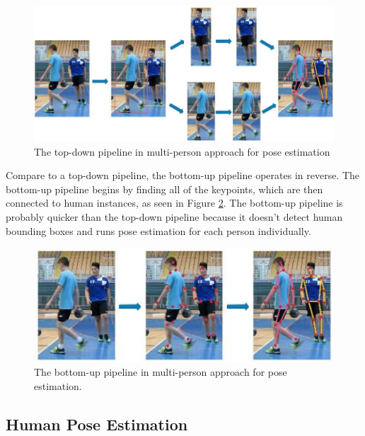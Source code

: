 \begin{figure}[ht]
  \centering
  \includegraphics[scale=0.8]{gambar/top-down-approach.png}
  \caption{The top-down pipeline in multi-person approach for pose estimation}
  \label{fig:top-down-approach}
\end{figure}

Compare to a top-down pipeline, the bottom-up pipeline operates in reverse. The bottom-up pipeline begins by finding all of the keypoints, which are then connected to human instances, as seen in Figure \ref{fig:bottom-up-approach}. 
The bottom-up pipeline is probably quicker than the top-down pipeline because it doesn't detect human bounding boxes and runs pose estimation for each person individually.

\begin{figure}[ht]
  \centering
  \includegraphics[scale=1.2]{gambar/bottom-up-approach.png}
  \caption{The bottom-up pipeline in multi-person approach for pose estimation.}
  \label{fig:bottom-up-approach}
\end{figure}

\subsection{Human Pose Estimation}
\label{subsec:humanposeestimation}

